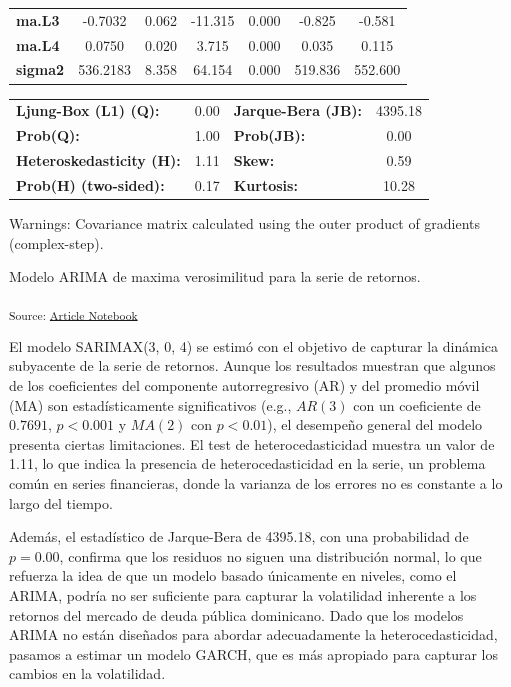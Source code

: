 \documentclass[
  number,
  preprint,
  3p,
  onecolumn]{elsarticle}
\begin{document}
\begin{center}
\begin{tabular}{lcccccc}
\textbf{ma.L3}     &      -0.7032  &        0.062     &   -11.315  &         0.000        &       -0.825    &       -0.581     \\
\textbf{ma.L4}     &       0.0750  &        0.020     &     3.715  &         0.000        &        0.035    &        0.115     \\
\textbf{sigma2}    &     536.2183  &        8.358     &    64.154  &         0.000        &      519.836    &      552.600     \\
\bottomrule
\end{tabular}
\begin{tabular}{lclc}
\textbf{Ljung-Box (L1) (Q):}     & 0.00 & \textbf{  Jarque-Bera (JB):  } & 4395.18  \\
\textbf{Prob(Q):}                & 1.00 & \textbf{  Prob(JB):          } &   0.00   \\
\textbf{Heteroskedasticity (H):} & 1.11 & \textbf{  Skew:              } &   0.59   \\
\textbf{Prob(H) (two-sided):}    & 0.17 & \textbf{  Kurtosis:          } &  10.28   \\
\bottomrule
\end{tabular}
\end{center}

Warnings: \newline
 [1] Covariance matrix calculated using the outer product of gradients (complex-step).

Modelo ARIMA de maxima verosimilitud para la serie de retornos.

\textsubscript{Source:
\href{https://iancont.github.io/fixed_income_garch/index-preview.html}{Article
Notebook}}

El modelo SARIMAX(3, 0, 4) se estimó con el objetivo de capturar la
dinámica subyacente de la serie de retornos. Aunque los resultados
muestran que algunos de los coeficientes del componente autorregresivo
(AR) y del promedio móvil (MA) son estadísticamente significativos
(e.g., \(AR(3)\) con un coeficiente de \(0.7691\), \(p < 0.001\) y
\(MA(2)\) con \(p < 0.01\)), el desempeño general del modelo presenta
ciertas limitaciones. El test de heterocedasticidad muestra un valor de
1.11, lo que indica la presencia de heterocedasticidad en la serie, un
problema común en series financieras, donde la varianza de los errores
no es constante a lo largo del tiempo.

Además, el estadístico de Jarque-Bera de 4395.18, con una probabilidad
de \(p = 0.00\), confirma que los residuos no siguen una distribución
normal, lo que refuerza la idea de que un modelo basado únicamente en
niveles, como el ARIMA, podría no ser suficiente para capturar la
volatilidad inherente a los retornos del mercado de deuda pública
dominicano. Dado que los modelos ARIMA no están diseñados para abordar
adecuadamente la heterocedasticidad, pasamos a estimar un modelo GARCH,
que es más apropiado para capturar los cambios en la volatilidad.
\end{document}
